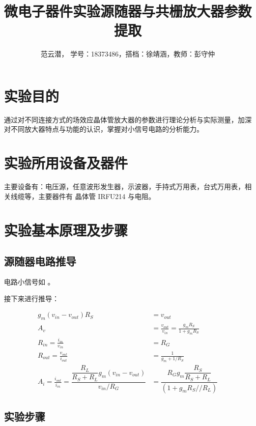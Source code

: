 \documentclass[lang=cn,11pt,a4paper,cite=authoryear]{elegantpaper}
\title{微电子器件实验\quad 源随器与共栅放大器参数提取}
\author{范云潜， 学号：18373486，搭档：徐靖涵，教师：彭守仲}
\institute{微电子学院 184111 班}
\date{\zhtoday}
\begin{document}
\maketitle


\section{实验目的}


通过对不同连接方式的场效应晶体管放大器的参数进行理论分析与实际测量，加深对不同放大器特点与功能的认识，掌握对小信号电路的分析能力。


\section{实验所用设备及器件}

主要设备有：电压源，任意波形发生器，示波器，手持式万用表，台式万用表，相关线缆等，主要器件有 晶体管 IRFU214 与电阻。

\section{实验基本原理及步骤}

\subsection{源随器电路推导}

电路小信号如  。


接下来进行推导： 

\[\begin{aligned}
    g_m(v_{in} - v_{out}) R_S &= v_{out} \\
    A_v &= \frac{v_{out}}{v_{in}} = \frac{g_m R_S}{1 + g_m R_S} \\ 
    R_{in} = \frac{i_{in}}{v_{in}} &= R_G \\ 
    R_{out} = \frac{v_{out}}{i_{out}} &= \frac{1}{g_m + 1/R_S} \\ 
    A_i = \frac{i_{out}}{i_{in}} =  \dfrac{\dfrac{R_L}{R_S + R_L} g_m (v_{in} - v_{out})}{v_{in} / R_G} &= \dfrac{R_G g_m \dfrac{R_S}{R_S + R_L}}{ (1 + g_m {R_S // R_L})}
\end{aligned}\]

\subsection{实验步骤}
\end{document}
